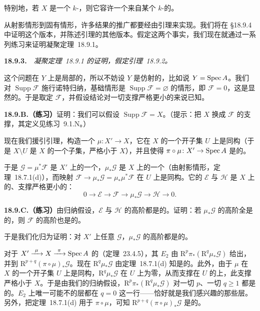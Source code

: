 特别地，若 $X$ 是一个\trProper{} $k$-\trVariety，则它容许一个来自某个\trProjective{} $k$-\trVariety{}的\trProjective\trBirational\trMorphism。

从射影情形到固有情形，许多结果的推广都要经由\trChow{}引理来实现。我们将在 \S18.9.4 中证明这个版本，并陈述\trChow{}引理的其他版本。假定这两个事实，我们现在就通过一系列练习来证明\mbox{\trGrothendieck{}凝聚定理~18.9.1}。

\textbf{18.9.3.}\ \extrahard\ \emph{\mbox{\trGrothendieck{}凝聚定理~18.9.1} 的证明，假定\mbox{\trChow{}引理~18.9.2}。}

这个问题在 $Y$ 上是局部的，所以不妨设 $Y$ 是仿射的，比如说 $Y=\operatorname{Spec} A$。我们对 $\operatorname{Supp}\mathscr{F}$ 施行诺特归纳，基础情形是 $\operatorname{Supp}\mathscr{F}=\varnothing$ 的情形，即 $\mathscr{F}=0$，这是显然的。于是取定 $\mathscr{F}$，并假设结论对一切支撑严格更小的\trCoherentSheaf{}来说已知。

\textbf{18.9.B.（练习）}\quad 证明：我们可以假设 $\operatorname{Supp}\mathscr{F}=X$。（提示：把 $X$ 换成 $\mathscr{F}$ 的\trSchemeTheoretic{}支撑，其定义见\mbox{练习~9.1.N}。）

现在我们援引\trChow{}引理，构造一个\trProjective\trMorphism{} $\mu\colon X'\to X$，它在 $X$ 的一个\trDense{}开子集 $U$ 上是同构（于是 $X\setminus U$ 是 $X$ 的一个\trClosed{}子集，严格小于 $X$），并且使得 $\pi\circ\mu\colon X'\to\operatorname{Spec} A$ 是\trProjective{}的。

于是 $\mathscr{G}=\mu^*\mathscr{F}$ 是 $X'$ 上的一个\trCoherentSheaf，$\mu_*\mathscr{G}$ 是 $X$ 上的一个\trCoherentSheaf（由射影情形，\mbox{定理~18.7.1(d)}），而\trAdjoint{}映射 $\mathscr{F}\to\mu_*\mathscr{G}=\mu_*\mu^*\mathscr{F}$ 在 $U$ 上是同构。它的\trKernel{} $\mathscr{E}$ 与\trCokernel{} $\mathscr{H}$ 是 $X$ 上的、支撑严格更小的\trCoherentSheaf：
\[
0\longrightarrow\mathscr{E}\longrightarrow\mathscr{F}\longrightarrow\mu_*\mathscr{G}\longrightarrow\mathscr{H}\longrightarrow 0.
\]

\textbf{18.9.C.（练习）}\quad 由归纳假设，$\mathscr{E}$ 与 $\mathscr{H}$ 的高阶\trPushforward{}都是\trCoh{}的。证明：若 $\mu_*\mathscr{G}$ 的高阶\trPushforward{}全是\trCoh{}的，则 $\mathscr{F}$ 的高阶\trPushforward{}也是\trCoh{}的。

于是我们化归为证明：对 $X'$ 上任意\trCoherentSheaf{} $\mathscr{G}$，$\mu_*\mathscr{G}$ 的高阶\trPushforward{}都是\trCoh{}的。

对于 $X'\xrightarrow{\ \mu\ }X\xrightarrow{\ \pi\ }\Spec A$ 的\trLeray\trSpectralSequence（\mbox{定理~23.4.5}），其 $E_2$ \trPage{}由 $\mathrm{R}^p\pi_*(\mathrm{R}^q\mu_*\mathscr{G})$ 给出，并\trConverge{}到 $\mathrm{R}^{p+q}(\pi\circ\mu)_*\mathscr{G}$。现在 $\mathrm{R}^q\mu_*\mathscr{G}$ 由\mbox{定理~18.7.1(d)} 知是\trCoh{}的。此外，由于 $\mu$ 在 $X$ 的一个\trDense{}开子集 $U$ 上是同构，$\mathrm{R}^q\mu_*\mathscr{G}$ 在 $U$ 上为零，从而支撑在 $U$ 的\trComplement{}上，此支撑严格小于 $X$。于是由我们的归纳假设，$\mathrm{R}^p\pi_*(\mathrm{R}^q\mu_*\mathscr{G})$ 对一切 $p$、一切 $q\ge 1$ 都是\trCoh{}的。$E_2$ \trPage{}上唯一可能不\trCoh{}的层都在 $q=0$ 这一行——恰好就是我们感兴趣的那些层。另外，把\mbox{定理~18.7.1(d)} 用于 $\pi\circ\mu$，可知 $\mathrm{R}^{p+q}(\pi\circ\mu)_*\mathscr{G}$ 是\trCoh{}的。

